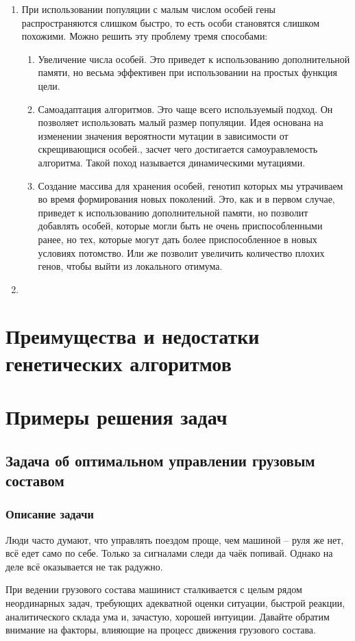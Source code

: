 \begin{itemize}
\begin{enumerate}
\item При использовании популяции с малым числом особей гены распространяются слишком быстро, то есть особи становятся слишком похожими. Можно решить эту проблему тремя способами:
	 \begin{enumerate}
	\item Увеличение числа особей. Это приведет к использованию дополнительной памяти, но весьма эффективен при использовании на простых функция цели.
	\item Самоадаптация алгоритмов. Это чаще всего используемый подход. Он позволяет использовать малый размер популяции. Идея основана на изменении значения вероятности мутации в зависимости от скрещивающися особей., засчет чего достигается самоуравлемость алгоритма. Такой поход называется динамическими мутациями.
	 \item Создание массива для хранения особей, генотип которых мы утрачиваем во время формирования новых поколений. Это, как и в первом случае, приведет к использованию дополнительной памяти, но позволит добавлять особей, которые могли быть не очень приспособленными ранее, но тех, которые могут дать более приспособленное в новых условиях потомство. Или же позволит увеличить количество плохих генов, чтобы выйти из локального отимума. 
	\end{enumerate}
\item 
\end{enumerate}
\chapter{Преимущества и недостатки генетических алгоритмов}
\chapter{Примеры решения задач}
\section{Задача об оптимальном управлении грузовым составом}
\subsection{Описание задачи}
Люди часто думают, что управлять поездом проще, чем машиной -- руля же нет, всё едет само по себе. Только за сигналами следи да чаёк попивай.
Однако на деле всё оказывается не так радужно.

При ведении грузового состава машинист сталкивается с целым рядом неординарных задач, требующих адекватной оценки ситуации, быстрой реакции, аналитического склада ума и, зачастую, хорошей интуиции.
Давайте обратим внимание на факторы, влияющие на процесс движения грузового состава.


\end{itemize}
